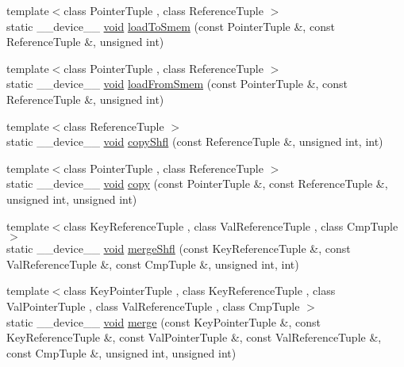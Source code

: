 \begin{DoxyCompactItemize}
\item 
{\footnotesize template$<$class Pointer\-Tuple , class Reference\-Tuple $>$ }\\static \-\_\-\-\_\-device\-\_\-\-\_\- \hyperlink{legacy_8hpp_a8bb47f092d473522721002c86c13b94e}{void} \hyperlink{structcv_1_1gpu_1_1device_1_1reduce__key__val__detail_1_1For_3_01N_00_01N_01_4_ac70ee7d283c77384c3b5338b799a6d23}{load\-To\-Smem} (const Pointer\-Tuple \&, const Reference\-Tuple \&, unsigned int)
\item 
{\footnotesize template$<$class Pointer\-Tuple , class Reference\-Tuple $>$ }\\static \-\_\-\-\_\-device\-\_\-\-\_\- \hyperlink{legacy_8hpp_a8bb47f092d473522721002c86c13b94e}{void} \hyperlink{structcv_1_1gpu_1_1device_1_1reduce__key__val__detail_1_1For_3_01N_00_01N_01_4_add9796cae4c50b30ed1588a2c0ad435d}{load\-From\-Smem} (const Pointer\-Tuple \&, const Reference\-Tuple \&, unsigned int)
\item 
{\footnotesize template$<$class Reference\-Tuple $>$ }\\static \-\_\-\-\_\-device\-\_\-\-\_\- \hyperlink{legacy_8hpp_a8bb47f092d473522721002c86c13b94e}{void} \hyperlink{structcv_1_1gpu_1_1device_1_1reduce__key__val__detail_1_1For_3_01N_00_01N_01_4_aa4eff988fd2556b701652cbc199f198e}{copy\-Shfl} (const Reference\-Tuple \&, unsigned int, int)
\item 
{\footnotesize template$<$class Pointer\-Tuple , class Reference\-Tuple $>$ }\\static \-\_\-\-\_\-device\-\_\-\-\_\- \hyperlink{legacy_8hpp_a8bb47f092d473522721002c86c13b94e}{void} \hyperlink{structcv_1_1gpu_1_1device_1_1reduce__key__val__detail_1_1For_3_01N_00_01N_01_4_a6a2b12cb23bdfd2bbb599b99b2324e31}{copy} (const Pointer\-Tuple \&, const Reference\-Tuple \&, unsigned int, unsigned int)
\item 
{\footnotesize template$<$class Key\-Reference\-Tuple , class Val\-Reference\-Tuple , class Cmp\-Tuple $>$ }\\static \-\_\-\-\_\-device\-\_\-\-\_\- \hyperlink{legacy_8hpp_a8bb47f092d473522721002c86c13b94e}{void} \hyperlink{structcv_1_1gpu_1_1device_1_1reduce__key__val__detail_1_1For_3_01N_00_01N_01_4_ac1827d729297c03cd68b34156a0f80ef}{merge\-Shfl} (const Key\-Reference\-Tuple \&, const Val\-Reference\-Tuple \&, const Cmp\-Tuple \&, unsigned int, int)
\item 
{\footnotesize template$<$class Key\-Pointer\-Tuple , class Key\-Reference\-Tuple , class Val\-Pointer\-Tuple , class Val\-Reference\-Tuple , class Cmp\-Tuple $>$ }\\static \-\_\-\-\_\-device\-\_\-\-\_\- \hyperlink{legacy_8hpp_a8bb47f092d473522721002c86c13b94e}{void} \hyperlink{structcv_1_1gpu_1_1device_1_1reduce__key__val__detail_1_1For_3_01N_00_01N_01_4_a4c7eafe3f10c0225e269c9919bf21a73}{merge} (const Key\-Pointer\-Tuple \&, const Key\-Reference\-Tuple \&, const Val\-Pointer\-Tuple \&, const Val\-Reference\-Tuple \&, const Cmp\-Tuple \&, unsigned int, unsigned int)
\end{DoxyCompactItemize}


